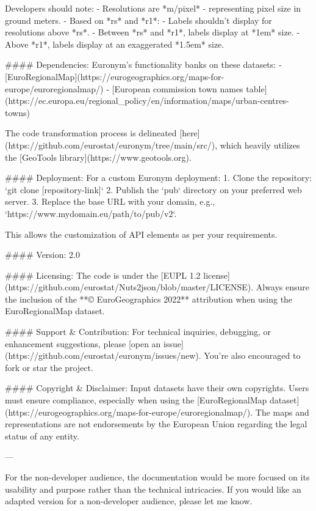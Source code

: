Developers should note:
- Resolutions are *m/pixel* - representing pixel size in ground meters.
- Based on *rs* and *r1*:
  - Labels shouldn't display for resolutions above *rs*.
  - Between *rs* and *r1*, labels display at *1em* size.
  - Above *r1*, labels display at an exaggerated *1.5em* size.

#### Dependencies:
Euronym's functionality banks on these datasets:
- [EuroRegionalMap](https://eurogeographics.org/maps-for-europe/euroregionalmap/)
- [European commission town names table](https://ec.europa.eu/regional_policy/en/information/maps/urban-centres-towns)

The code transformation process is delineated [here](https://github.com/eurostat/euronym/tree/main/src/), which heavily utilizes the [GeoTools library](https://www.geotools.org).

#### Deployment:
For a custom Euronym deployment:
1. Clone the repository: `git clone [repository-link]`
2. Publish the `pub` directory on your preferred web server.
3. Replace the base URL with your domain, e.g., `https://www.mydomain.eu/path/to/pub/v2`.

This allows the customization of API elements as per your requirements.

#### Version:
2.0

#### Licensing:
The code is under the [EUPL 1.2 license](https://github.com/eurostat/Nuts2json/blob/master/LICENSE). Always ensure the inclusion of the **© EuroGeographics 2022** attribution when using the EuroRegionalMap dataset.

#### Support & Contribution:
For technical inquiries, debugging, or enhancement suggestions, please [open an issue](https://github.com/eurostat/euronym/issues/new). You're also encouraged to fork or star the project.

#### Copyright & Disclaimer:
Input datasets have their own copyrights. Users must ensure compliance, especially when using the [EuroRegionalMap dataset](https://eurogeographics.org/maps-for-europe/euroregionalmap/). The maps and representations are not endorsements by the European Union regarding the legal status of any entity.

--- 

For the non-developer audience, the documentation would be more focused on its usability and purpose rather than the technical intricacies. If you would like an adapted version for a non-developer audience, please let me know.